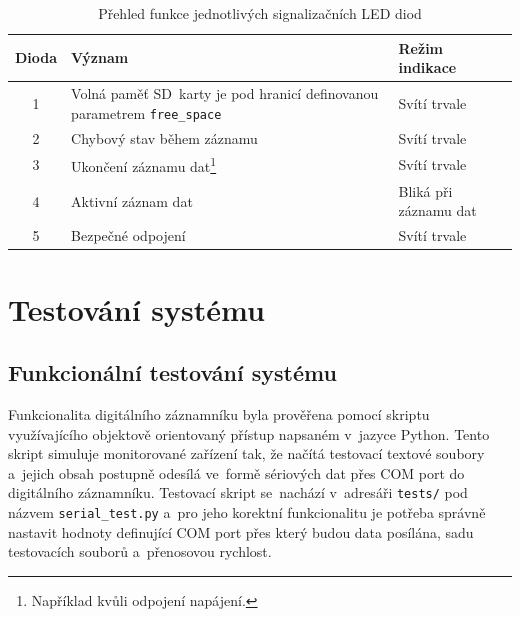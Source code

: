 
\begin{table}[h]
    \centering
    \renewcommand{\arraystretch}{1.2}
    \begin{tabularx}{\linewidth}{|c|X|X|}
        \hline
        \textbf{Dioda} & \textbf{Význam} & \textbf{Režim indikace} \\
        \hline
        1 & Volná paměť SD~karty je pod hranicí definovanou parametrem \texttt{free\_space} & Svítí trvale \\
        \hline
        2 & Chybový stav během záznamu & Svítí trvale \\
        \hline
        3 & Ukončení záznamu dat\footnote{Například kvůli odpojení napájení.} & Svítí trvale \\
        \hline
        4 & Aktivní záznam dat & Bliká při záznamu dat \\
        \hline
        5 & Bezpečné odpojení & Svítí trvale \\
        \hline
    \end{tabularx}
    \caption{Přehled funkce jednotlivých signalizačních LED diod}
    \label{tab:signal_leds}
\end{table}
\chapter{Testování systému}
\label{testovani_systemu}

\section{Funkcionální testování systému}
Funkcionalita digitálního záznamníku byla prověřena pomocí skriptu využívajícího objektově
orientovaný přístup napsaném v~jazyce Python. Tento skript simuluje monitorované
zařízení tak, že načítá testovací textové soubory a~jejich obsah postupně odesílá ve~formě
sériových dat přes COM port do digitálního záznamníku. Testovací skript se~nachází v~adresáři
\texttt{tests/} pod názvem \texttt{serial\_test.py} a~pro jeho korektní funkcionalitu je potřeba
správně nastavit hodnoty definující COM port přes který budou data posílána, sadu testovacích
souborů a~přenosovou rychlost.

